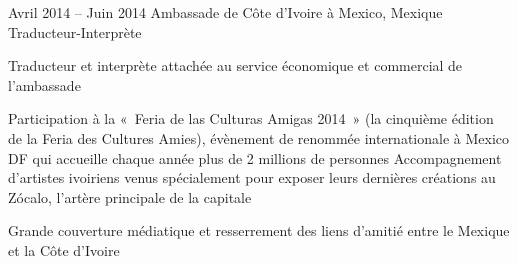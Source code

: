 \documentclass[30pt, french]{tccv}
\begin{document}
\begin{upshape}
\begin{experience}
\vspace{1.5cm}
\item{Avril 2014 -- Juin 2014}
     {Ambassade de Côte d’Ivoire à Mexico, Mexique}
     {Traducteur-Interprète}
     \fontsize{10pt}{1.1em}\color{text}\bodyfontlight\upshape\selectfont

 Traducteur et interprète attachée au service économique et commercial de l’ambassade  \\
    \setlength{\parskip}{-10pt}
    \begin{itemize}
      \cvitem[\checkmark] Participation à la « Feria de las Culturas Amigas 2014 » (la cinquième édition de la Feria des Cultures Amies), évènement de renommée internationale à Mexico DF qui accueille chaque année plus de 2 millions de personnes
      \cvitem[\checkmark] Accompagnement d’artistes ivoiriens venus spécialement pour exposer leurs dernières créations au Zócalo, l’artère principale de la capitale
    \end{itemize}     
 Grande couverture médiatique et resserrement des liens d’amitié entre le Mexique et la Côte d’Ivoire



\end{experience}





\end{upshape}
\end{document}
